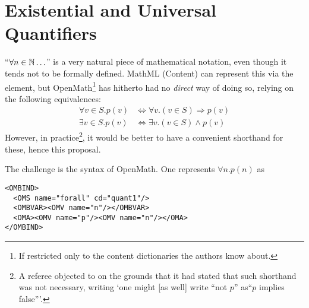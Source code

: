 \documentclass{llncs}
\begin{document}
\section{Existential and Universal Quantifiers}

``$\forall n\in\mathbb{N}\ldots$'' is a very natural piece of mathematical notation, even though it
tends not to be formally defined. MathML (Content) can represent this via the
{} element, but OpenMath\footnote{If restricted only to the content
  dictionaries the authors know about.} has hitherto had no {\emph{direct}} way of doing
so, relying on the following equivalences:
\begin{eqnarray}
\label{eq:forall}
\forall  v\in S. p(v)&\Leftrightarrow \forall v.(v\in S)\Rightarrow p(v)\\
\label{eq:exists}
\exists  v\in S. p(v)&\Leftrightarrow \exists v.(v\in S)\land p(v)
\end{eqnarray}
However, in practice\footnote{A referee objected to \cite{DavenportKohlhase2009a} on the
  grounds that it had stated that such shorthand was not necessary, writing `one might [as well]
  write ``not $p$'' as``$p$ implies false'''.}, it would be better to have a convenient
shorthand for these, hence this proposal.

The challenge is the syntax of OpenMath. One represents $\forall n.p(n)$ as
\begin{lstlisting}
<OMBIND>
  <OMS name="forall" cd="quant1"/>
  <OMBVAR><OMV name="n"/></OMBVAR>
  <OMA><OMV name="p"/><OMV name="n"/></OMA> 
</OMBIND>
\end{lstlisting}
\end{document}
